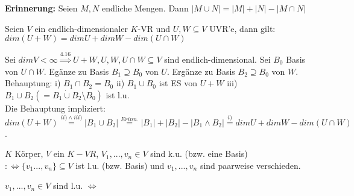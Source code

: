 \noindent\textbf{Erinnerung:} Seien $M,N$ endliche Mengen. Dann $|M\cup N|=|M|+|N|-|M\cap N|$

\begin{satz}
	Seien $V$ ein endlich-dimensionaler $K$-VR und $U,W\subseteq V$ UVR'e, dann gilt: $dim(U+W)=dim U+dim W-dim(U\cap W)$
\end{satz}

\begin{bew}
	Sei $dim V < \infty \stackrel{4.16}{\Rightarrow} U+W,U,W,U\cap W\subseteq V$ sind endlich-dimensional. Sei $B_0$ Basis von $U\cap W$. Egänze zu Basis $B_1\supseteq B_0$ von $U$. Ergänze zu Basis $B_2\supseteq B_0$ von $W$. Behauptung: i) $B_1\cap B_2 =B_0$ ii) $B_1\cup B_0$ ist ES von $U+W$ iii) $B_1\cup B_2(=B_1\mathbin{\dot{\cup}} B_2\setminus B_0)$ ist l.u.\\
	Die Behauptung impliziert: $dim(U+W)\stackrel{ii)\wedge iii)}{=} |B_1\cup B_2|\stackrel{Erinn.}{=} |B_1|+|B_2|-|B_1\wedge B_2|\stackrel{i)}{=} dim U+dim W-dim(U\cap W)$.
\end{bew}

\begin{nota}
	$K$ Körper, $V$ ein $K-VR$, $V_1,...,v_n\in V$ sind k.u. (bzw. eine Basis) $:\Leftrightarrow \{v_1...,v_n\}\subseteq V$ ist l.u. (bzw. Basis) und $v_1,...,v_n$ sind paarweise verschieden.
\end{nota}

\begin{bem}
	$v_1,...,v_n\in V$ sind l.u. $\Leftrightarrow$
\end{bem}